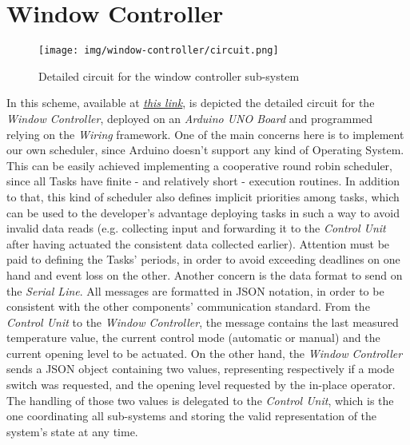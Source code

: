 \documentclass[a4paper,12pt]{report}
\begin{document}
	\section{Window Controller}
	\begin{figure}[H]
		\centering{}
		\texttt{[image: img/window-controller/circuit.png]}
		\caption{Detailed circuit for the window controller sub-system}
		\label{img:window-controller/circuit}
	\end{figure}
	In this scheme, available at \href{https://www.tinkercad.com/things/2nadVXk0wQ5-esiot-assignment-03-arduino?sharecode=t4LayAw_Rc1SNLqdSHt3uK_EuT6TttEPHQjHAwEp-Zc}{\textit{this link}}, is depicted the detailed circuit for the \textit{Window Controller}, deployed on an \textit{Arduino UNO Board} and programmed relying on the \textit{Wiring} framework.
	\newline One of the main concerns here is to implement our own scheduler, since Arduino doesn't support any kind of Operating System. This can be easily achieved implementing a cooperative round robin scheduler, since all Tasks have finite - and relatively short - execution routines. In addition to that, this kind of scheduler also defines implicit priorities among tasks, which can be used to the developer's advantage deploying tasks in such a way to avoid invalid data reads (e.g. collecting input and forwarding it to the \textit{Control Unit} after having actuated the consistent data collected earlier). Attention must be paid to defining the Tasks' periods, in order to avoid exceeding deadlines on one hand and event loss on the other.
	\newline Another concern is the data format to send on the \textit{Serial Line}. All messages are formatted in JSON notation, in order to be consistent with the other components' communication standard. From the \textit{Control Unit} to the \textit{Window Controller}, the message contains the last measured temperature value, the current control mode (automatic or manual) and the current opening level to be actuated. On the other hand, the \textit{Window Controller} sends a JSON object containing two values, representing respectively if a mode switch was requested, and the opening level requested by the in-place operator. The handling of those two values is delegated to the \textit{Control Unit}, which is the one coordinating all sub-systems and storing the valid representation of the system's state at any time.
\end{document}
